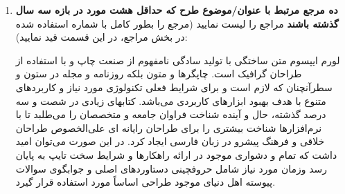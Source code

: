 \documentclass[letterpaper,11pt]{article}
\begin{document}
\begin{enumerate}
\begin{mdframed}[leftmargin=10pt,rightmargin=10pt]
\end{mdframed}
\item \textbf{ده مرجع مرتبط با عنوان/موضوع طرح که حداقل هشت مورد در بازه سه سال گذشته باشند} \newline
مراجع را لیست نمایید (مرجع را بطور کامل با شماره استفاده شده در بخش مراجع، در این قسمت قید نمایید):
\begin{mdframed}[leftmargin=10pt,rightmargin=10pt]
لورم ایپسوم متن ساختگی با تولید سادگی نامفهوم از صنعت چاپ و با استفاده از طراحان گرافیک است. چاپگرها و متون بلکه روزنامه و مجله در ستون و سطرآنچنان که لازم است و برای شرایط فعلی تکنولوژی مورد نیاز و کاربردهای متنوع با هدف بهبود ابزارهای کاربردی می‌باشد. کتابهای زیادی در شصت و سه درصد گذشته، حال و آینده شناخت فراوان جامعه و متخصصان را می‌طلبد تا با نرم‌افزارها شناخت بیشتری را برای طراحان رایانه ای علی‌الخصوص طراحان خلاقی و فرهنگ پیشرو در زبان فارسی ایجاد کرد. در این صورت می‌توان امید داشت که تمام و دشواری موجود در ارائه راهکارها و شرایط سخت تایپ به پایان رسد وزمان مورد نیاز شامل حروفچینی دستاوردهای اصلی و جوابگوی سوالات پیوسته اهل دنیای موجود طراحی اساساً مورد استفاده قرار گیرد.
\end{mdframed}
\end{enumerate}
\end{document}
